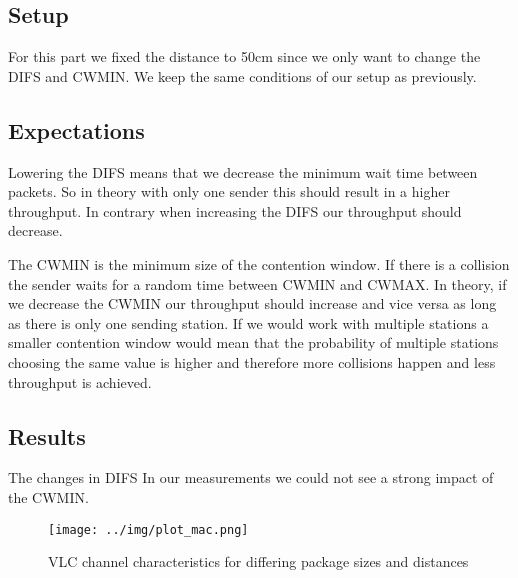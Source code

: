 \subsection{Setup}
For this part we fixed the distance to 50cm since we only want to change the DIFS and CWMIN. We keep the same conditions of our setup as previously.

\subsection{Expectations}
Lowering the DIFS means that we decrease the minimum wait time between packets. So in theory with only one sender this should result in a higher throughput.
In contrary when increasing the DIFS our throughput should decrease.

The CWMIN is the minimum size of the contention window. If there is a collision the sender waits for a random time between CWMIN and CWMAX.
In theory, if we decrease the CWMIN our throughput should increase and vice versa as long as there is only one sending station.
If we would work with multiple stations a smaller contention window would mean that the probability of multiple stations choosing the same value is higher and therefore more collisions happen and less throughput is achieved.

\subsection{Results}
The changes in DIFS 
In our measurements we could not see a strong impact of the CWMIN.

\begin{figure}[htp]
\centering
\texttt{[image: ../img/plot\_mac.png]}
\caption{VLC channel characteristics for differing package sizes and distances}
\label{fig:chanchar}
\end{figure}